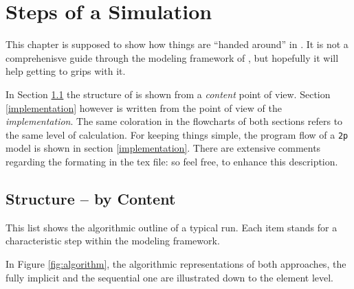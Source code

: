 \section{Steps of a \Dumux Simulation}
\label{flow}


This chapter is supposed to show how things are ``handed around'' in \Dumux. It
is not a comprehenisve guide through the modeling framework of \Dumux, but
hopefully it will help getting to grips with it.

In Section \ref{content} the structure of \Dumux is shown from a \emph{content}
point of view.
Section \ref{implementation} however is written from the point of view of the \emph{implementation}.
The same coloration in the flowcharts of both sections refers to the same level of calculation. For keeping things 
simple, the program flow of a \verb+2p+ model is shown in section \ref{implementation}. There are extensive comments 
regarding the formating in the tex file: so feel free, to enhance this description.

\subsection{Structure -- by Content}

\label{content}
This list shows the algorithmic outline of a typical \Dumux run. Each item stands
for a characteristic step within the modeling framework.

In Figure \ref{fig:algorithm}, the algorithmic representations of both approaches, the fully 
implicit and the sequential one are illustrated down to the element level.


